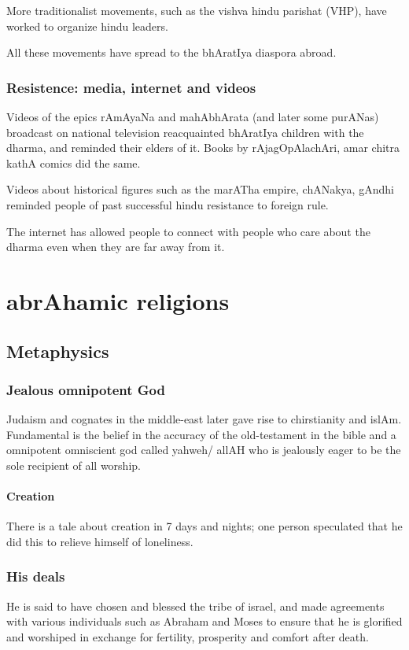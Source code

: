 \documentclass[oneside, article]{memoir}
\begin{document}
More traditionalist movements, such as the vishva hindu parishat (VHP), have worked to organize hindu leaders.

All these movements have spread to the bhAratIya diaspora abroad.

\subsection{Resistence: media, internet and videos}
Videos of the epics rAmAyaNa and mahAbhArata (and later some purANas) broadcast on national television reacquainted bhAratIya children with the dharma, and reminded their elders of it. Books by rAjagOpAlachAri, amar chitra kathA comics did the same.

Videos about historical figures such as the marATha empire, chANakya, gAndhi reminded people of past successful hindu resistance to foreign rule.

The internet has allowed people to connect with people who care about the dharma even when they are far away from it. \tbc

\chapter{abrAhamic religions}
\section{Metaphysics}
\subsection{Jealous omnipotent God}
Judaism and cognates in the middle-east later gave rise to chirstianity and islAm. Fundamental is the belief in the accuracy of the old-testament in the bible and a omnipotent omniscient god called yahweh/ allAH who is jealously eager to be the sole recipient of all worship.

\subsubsection{Creation}
There is a tale about creation in 7 days and nights; one person speculated that he did this to relieve himself of loneliness.

\subsection{His deals}
He is said to have chosen and blessed the tribe of israel, and made agreements with various individuals such as Abraham and Moses to ensure that he is glorified and worshiped in exchange for fertility, prosperity and comfort after death.
\end{document}
